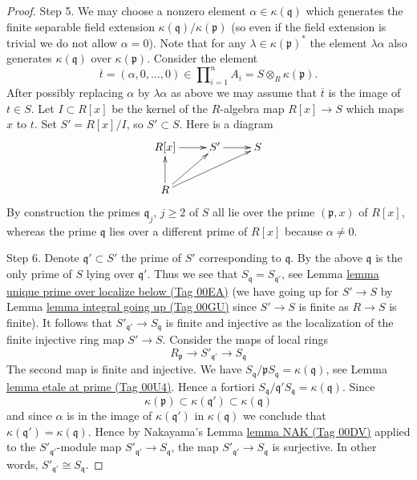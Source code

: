 \documentclass{amsart}
\theoremstyle{plain}
\theoremstyle{definition}
\theoremstyle{remark}
\numberwithin{equation}{subsection}
\begin{document}
\begin{proof}
\medskip\noindent
Step 5. We may choose a nonzero element $\alpha \in \kappa(\mathfrak q)$ which
generates the finite separable field extension
$\kappa(\mathfrak q)/\kappa(\mathfrak p)$ (so even if the
field extension is trivial we do not allow $\alpha = 0$).
Note that for any $\lambda \in \kappa(\mathfrak p)^*$ the
element $\lambda \alpha$ also generates $\kappa(\mathfrak q)$
over $\kappa(\mathfrak p)$. Consider the element
$$
\overline{t} =
(\alpha, 0, \ldots, 0) \in
\prod\nolimits_{i = 1}^n A_i =
S \otimes_R \kappa(\mathfrak p).
$$
After possibly replacing $\alpha$ by $\lambda \alpha$ as above
we may assume that $\overline{t}$ is the image of $t \in S$.
Let $I \subset R[x]$ be the kernel of the $R$-algebra
map $R[x] \to S$ which maps $x$ to $t$. Set $S' = R[x]/I$,
so $S' \subset S$. Here is a diagram
$$
\xymatrix{
R[x] \ar[r] & S' \ar[r] & S \\
R \ar[u] \ar[ru] \ar[rru] & &
}
$$
By construction the primes $\mathfrak q_j$, $j \geq 2$ of $S$ all
lie over the prime $(\mathfrak p, x)$ of $R[x]$, whereas
the prime $\mathfrak q$ lies over a different prime of $R[x]$
because $\alpha \not = 0$.

\medskip\noindent
Step 6. Denote $\mathfrak q' \subset S'$ the prime of $S'$
corresponding to $\mathfrak q$. By the above $\mathfrak q$ is
the only prime of $S$ lying over $\mathfrak q'$. Thus we see that
$S_{\mathfrak q} = S_{\mathfrak q'}$, see
Lemma \href{https://stacks.math.columbia.edu/tag/00EA}{lemma unique prime over localize below (Tag 00EA)} (we have
going up for $S' \to S$ by Lemma \href{https://stacks.math.columbia.edu/tag/00GU}{lemma integral going up (Tag 00GU)}
since $S' \to S$ is finite as $R \to S$ is finite).
It follows that $S'_{\mathfrak q'} \to S_{\mathfrak q}$ is finite
and injective as the localization of the finite injective ring map
$S' \to S$. Consider the maps of local rings
$$
R_{\mathfrak p} \to S'_{\mathfrak q'} \to S_{\mathfrak q}
$$
The second map is finite and injective. We have
$S_{\mathfrak q}/\mathfrak pS_{\mathfrak q} = \kappa(\mathfrak q)$,
see Lemma \href{https://stacks.math.columbia.edu/tag/00U4}{lemma etale at prime (Tag 00U4)}.
Hence a fortiori
$S_{\mathfrak q}/\mathfrak q'S_{\mathfrak q} = \kappa(\mathfrak q)$.
Since
$$
\kappa(\mathfrak p) \subset \kappa(\mathfrak q') \subset \kappa(\mathfrak q)
$$
and since $\alpha$ is in the image of $\kappa(\mathfrak q')$ in
$\kappa(\mathfrak q)$
we conclude that $\kappa(\mathfrak q') = \kappa(\mathfrak q)$.
Hence by Nakayama's Lemma \href{https://stacks.math.columbia.edu/tag/00DV}{lemma NAK (Tag 00DV)} applied to the
$S'_{\mathfrak q'}$-module map $S'_{\mathfrak q'} \to S_{\mathfrak q}$,
the map $S'_{\mathfrak q'} \to S_{\mathfrak q}$ is surjective.
In other words,
$S'_{\mathfrak q'} \cong S_{\mathfrak q}$.


\end{proof}
\end{document}
